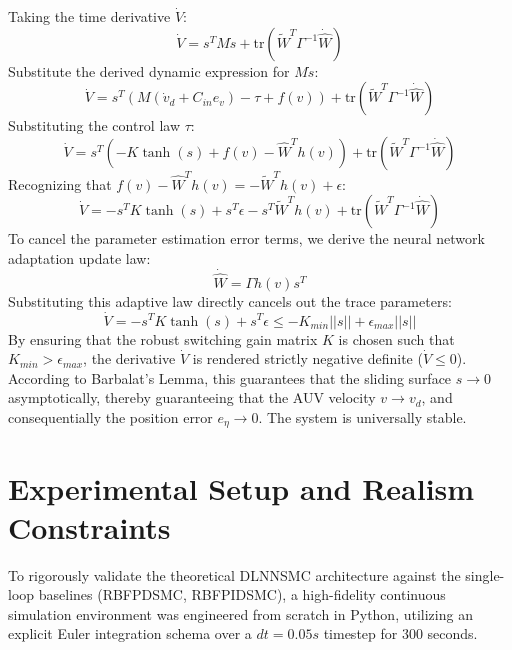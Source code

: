\documentclass[conference]{IEEEtran}
\begin{document}
Taking the time derivative $\dot{V}$:
\begin{equation}
\dot{V} = s^T M \dot{s} + \text{tr}(\tilde{W}^T \Gamma^{-1} \dot{\hat{W}})
\end{equation}
Substitute the derived dynamic expression for $M\dot{s}$:
\begin{equation}
\dot{V} = s^T (M(\dot{v}_d + C_{in} e_v) - \tau + f(v)) + \text{tr}(\tilde{W}^T \Gamma^{-1} \dot{\hat{W}})
\end{equation}
Substituting the control law $\tau$:
\begin{equation}
\dot{V} = s^T (-K \tanh(s) + f(v) - \hat{W}^T h(v)) + \text{tr}(\tilde{W}^T \Gamma^{-1} \dot{\hat{W}})
\end{equation}
Recognizing that $f(v) - \hat{W}^T h(v) = -\tilde{W}^T h(v) + \epsilon$:
\begin{equation}
\dot{V} = -s^T K \tanh(s) + s^T \epsilon - s^T \tilde{W}^T h(v) + \text{tr}(\tilde{W}^T \Gamma^{-1} \dot{\hat{W}})
\end{equation}
To cancel the parameter estimation error terms, we derive the neural network adaptation update law:
\begin{equation}
\dot{\hat{W}} = \Gamma h(v) s^T
\end{equation}
Substituting this adaptive law directly cancels out the trace parameters:
\begin{equation}
\dot{V} = -s^T K \tanh(s) + s^T \epsilon \leq -K_{min} ||s|| + \epsilon_{max} ||s||
\end{equation}
By ensuring that the robust switching gain matrix $K$ is chosen such that $K_{min} > \epsilon_{max}$, the derivative $\dot{V}$ is rendered strictly negative definite ($\dot{V} \leq 0$). According to Barbalat's Lemma, this guarantees that the sliding surface $s \rightarrow 0$ asymptotically, thereby guaranteeing that the AUV velocity $v \rightarrow v_d$, and consequentially the position error $e_\eta \rightarrow 0$. The system is universally stable.

\section{Experimental Setup and Realism Constraints}
To rigorously validate the theoretical DLNNSMC architecture against the single-loop baselines (RBFPDSMC, RBFPIDSMC), a high-fidelity continuous simulation environment was engineered from scratch in Python, utilizing an explicit Euler integration schema over a $dt = 0.05s$ timestep for 300 seconds. 
\end{document}
